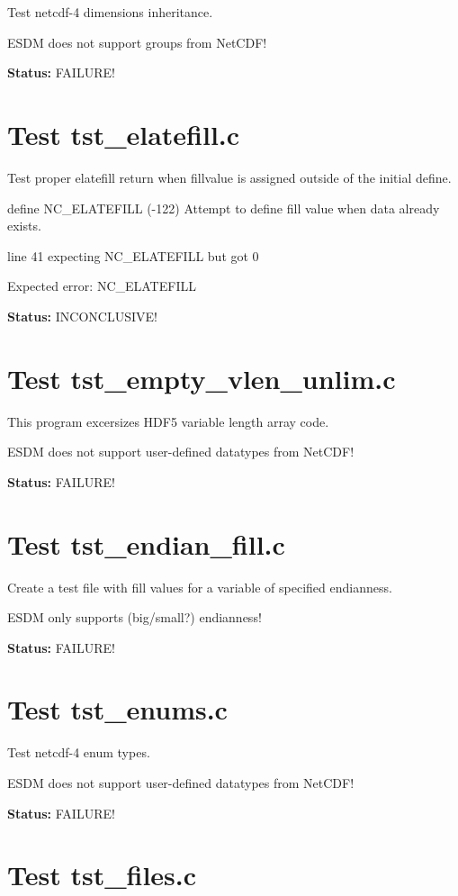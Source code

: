 Test netcdf-4 dimensions inheritance.

ESDM does not support groups from NetCDF!

{\bf \large Status: } FAILURE!

\section{Test tst\_elatefill.c}

Test proper elatefill return when fillvalue is assigned outside of
the initial define.

define NC\_ELATEFILL     (-122)    Attempt to define fill value when data already exists.

line 41 expecting NC\_ELATEFILL but got 0

Expected error: NC\_ELATEFILL

{\bf \large Status: } INCONCLUSIVE!

\section{Test tst\_empty\_vlen\_unlim.c}

This program excersizes HDF5 variable length array code.

ESDM does not support user-defined datatypes from NetCDF!

{\bf \large Status: } FAILURE!

\section{Test tst\_endian\_fill.c}

Create a test file with fill values for a variable of specified endianness.

ESDM only supports (big/small?) endianness!

{\bf \large Status: } FAILURE!

\section{Test tst\_enums.c}

Test netcdf-4 enum types.

ESDM does not support user-defined datatypes from NetCDF!

{\bf \large Status: } FAILURE!

\section{Test tst\_files.c}

